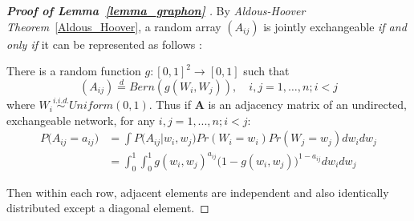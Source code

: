 \documentclass[12pt]{article}
\theoremstyle{definition}
\begin{document}
\begin{proof}[\textbf{Proof of Lemma~\ref{lemma_graphon} }] 
	By \textit{Aldous-Hoover Theorem}~\ref{Aldous_Hoover}, a random array $(A_{ij})$ is jointly exchangeable \textit{if and only if} it can be represented as follows : 
		
	There is a random function $g : [0,1]^2 \rightarrow [0,1]$ such that 
\begin{equation}
(A_{ij})  \stackrel{d}{=} Bern( g(W_{i}, W_{j})), \quad i,j=1,\ldots,n; i < j
\end{equation}
where $W_{i} \overset{i.i.d.}{\sim} Uniform(0,1)$. Thus if $\mathbf{A}$ is an adjacency matrix of an undirected, exchangeable network, for any $i,j = 1,... , n; i < j$:
\begin{equation}
\begin{split}
	P \big(  A_{ij} = a_{ij} \big) & = \int P \big( A_{ij} \big| w_{i}, w_{j} \big) Pr(W_{i} = w_{i}) Pr(W_{j} = w_{j}) dw_{i} dw_{j} \\ & = \int_{0}^{1} \int_{0}^{1} g( w_{i},  w_{j})^{a_{ij}} \big( 1- g( w_{i},  w_{j}) \big)^{1-a_{ij}} dw_{i} dw_{j} 
\end{split}
\end{equation}
		
Then within each row, adjacent elements are independent and also identically distributed except a diagonal element.

\end{proof}
	
\end{document}
